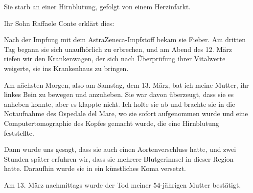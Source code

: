 Sie starb an einer Hirnblutung, gefolgt von einem Herzinfarkt.

Ihr Sohn Raffaele Conte erklärt dies:

Nach der Impfung mit dem AstraZeneca-Impfstoff bekam sie Fieber. Am dritten Tag
begann sie sich unaufhörlich zu erbrechen, und am Abend des 12. März riefen wir
den Krankenwagen, der sich nach Überprüfung ihrer Vitalwerte weigerte, sie ins
Krankenhaus zu bringen.

Am nächsten Morgen, also am Samstag, dem 13. März, bat ich meine Mutter, ihr
linkes Bein zu bewegen und anzuheben. Sie war davon überzeugt, dass sie es
anheben konnte, aber es klappte nicht. Ich holte sie ab und brachte sie in die
Notaufnahme des Ospedale del Mare, wo sie sofort aufgenommen wurde und eine
Computertomographie des Kopfes gemacht wurde, die eine Hirnblutung feststellte.

Dann wurde uns gesagt, dass sie auch einen Aortenverschluss hatte, und zwei
Stunden später erfuhren wir, dass sie mehrere Blutgerinnsel in dieser Region
hatte. Daraufhin wurde sie in ein künstliches Koma versetzt.

Am 13. März nachmittags wurde der Tod meiner 54-jährigen Mutter bestätigt.
